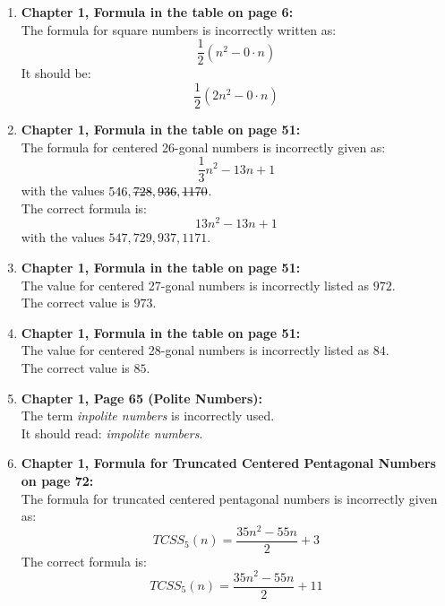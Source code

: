 \documentclass[10pt, a4paper]{article}
\begin{document}
\begin{enumerate}
    \item \textbf{Chapter 1, Formula in the table on page 6:} \\
          The formula for square numbers is incorrectly written as:
          \[
              \frac{1}{2} (n^2 - 0 \cdot n)
          \]
          It should be:
          \[
              \frac{1}{2} (2n^2 - 0 \cdot n)
          \]

    \item \textbf{Chapter 1, Formula in the table on page 51:} \\
          The formula for centered 26-gonal numbers is incorrectly given as:
          \[
              \frac{1}{3}n^2 - 13n + 1
          \]
          with the values \( 546, \text{\sout{728}}, \text{\sout{936}}, \text{\sout{1170}} \). \\
          The correct formula is:
          \[
              13n^2 - 13n + 1
          \]
          with the values \( 547, 729, 937, 1171 \).

    \item \textbf{Chapter 1, Formula in the table on page 51:} \\
          The value for centered 27-gonal numbers is incorrectly listed as \(972\). \\
          The correct value is \(973\).

    \item \textbf{Chapter 1, Formula in the table on page 51:} \\
          The value for centered 28-gonal numbers is incorrectly listed as \(84\). \\
          The correct value is \(85\).

    \item \textbf{Chapter 1, Page 65 (Polite Numbers):} \\
          The term \emph{inpolite numbers} is incorrectly used. \\
          It should read: \emph{impolite numbers}.

    \item \textbf{Chapter 1, Formula for Truncated Centered Pentagonal Numbers on page 72:} \\
          The formula for truncated centered pentagonal numbers is incorrectly given as:
          \[
              TCSS_5(n) = \frac{35n^2 - 55n}{2} + 3
          \]
          The correct formula is:
          \[
              TCSS_5(n) = \frac{35n^2 - 55n}{2} + 11
          \]


\end{enumerate}
\end{document}
